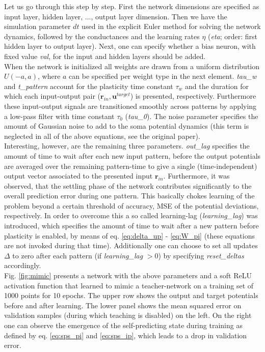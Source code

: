 \documentclass[12pt,a4paper]{article}
\begin{document}
Let us go through this step by step. First the network dimensions are specified as input layer, hidden layer, ..., output layer dimension. Then we have the simulation parameter $dt$ used in the explicit Euler method for solving the network dynamics, followed by the conductances and the learning rates $\eta$ (\textit{eta}; order: first hidden layer to output layer). Next, one can specify whether a bias neuron, with fixed value \textit{val}, for the input and hidden layers should be added.\\
When the network is initialized all weights are drawn from a uniform distribution $U(-a,a)$, where $a$ can be specified per weight type in the next element. \textit{tau\_w} and \textit{t\_pattern} account for the plasticity time constant $\tau_w$ and the duration for which each input-output pair ($\bm{r}_{in},\bm{u}^{target}$) is presented, respectively. Furthermore these input-output signals are transitioned smoothly across patterns by applying a low-pass filter with time constant $\tau_0$ (\textit{tau\_0}). The noise parameter specifies the amount of Gaussian noise to add to the soma potential dynamics (this term is neglected in all of the above equations, see the original paper).\\
Interesting, however, are the remaining three parameters. \textit{out\_lag} specifies the amount of time to wait after each new input pattern, before the output potentials are averaged over the remaining pattern-time to give a single (time-independent) output vector associated to the presented input $\bm{r}_{in}$. Furthermore, it was observed, that the settling phase of the network contributes significantly to the overall prediction error during one pattern. This basically chokes learning of the problem beyond a certain threshold of accuracy, MSE of the potential deviations, respectively. In order to overcome this a so called learning-lag (\textit{learning\_lag}) was introduced, which specifies the amount of time to wait after a new pattern before plasticity is enabled, by means of eq. \eqref{eq:delta_up} - \eqref{eq:W_pi} (these equations are not invoked during that time). Additionally one can choose to set all updates $\Delta$ to zero after each pattern (if \textit{learning\_lag} $> 0$) by specifying \textit{reset\_deltas} accordingly.\\

Fig. \ref{fig:mimic} presents a network with the above parameters and a soft ReLU activation function that learned to mimic a teacher-network on a training set of 1000 points for 10 epochs. The upper row shows the output and target potentials before and after learning. The lower panel shows the mean squared error on validation samples (during which teaching is disabled) on the left. On the right one can observe the emergence of the self-predicting state during training as defined by eq. \eqref{eq:sps_pi} and \eqref{eq:sps_ip}, which leads to a drop in validation error.
\end{document}

